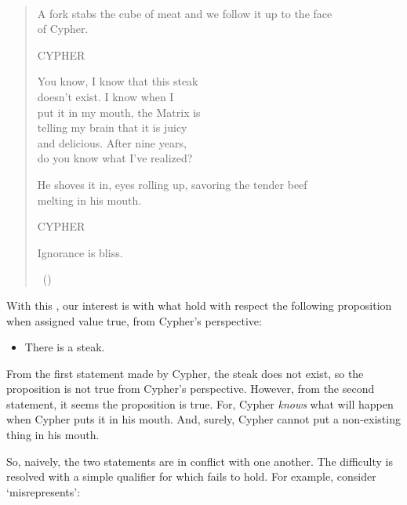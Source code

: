 \begin{note}
  \begin{scenario}
    \mbox{ }%
    \vspace{-\baselineskip}
    \begin{quote}
      {
        \ttfamily

        A fork stabs the cube of meat and we follow it up to the face \\
        of Cypher.

        \qquad\qquad CYPHER

        \qquad You know, I know that this steak \\
        \indent\qquad doesn't exist. I know when I \\
        \indent\qquad put it in my mouth, the Matrix is \\
        \indent\qquad telling my brain that it is juicy \\
        \indent\qquad and delicious. After nine years, \\
        \indent\qquad do you know what I've realized?

        He shoves it in, eyes rolling up, savoring the tender beef \\
         melting in his mouth.

        \qquad\qquad CYPHER

        \qquad Ignorance is bliss.}%
      \mbox{ }\hfill\mbox{(\citeyear[330--331]{Wachowski:2000uh})}
    \end{quote}%
    \vspace{-\baselineskip}
  \end{scenario}

  With this \scen{}, our interest is with what hold with respect the following proposition when assigned value true, from Cypher's perspective:

  \begin{itemize}
  \item
    There is a steak.
  \end{itemize}

  From the first statement made by Cypher, the steak does not exist, so the proposition is not true from Cypher's perspective.
  However, from the second statement, it seems the proposition is true.
  For, Cypher \emph{knows} what will happen when Cypher puts it in his mouth.
  And, surely, Cypher cannot put a non-existing thing in his mouth.

  So, naively, the two statements are in conflict with one another.
  The difficulty is resolved with a simple qualifier for which \ptivity{} fails to hold.
  For example, consider `misrepresents':


\end{note}
